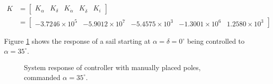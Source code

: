 \documentclass[]{aiaa-tc}%
\begin{document}
\begin{equation}
\begin{aligned}
K &= \begin{bmatrix}
K_{\alpha} & K_{\delta} & K_{\dot{\alpha}} & K_{\dot{\delta}} & K_i
\end{bmatrix}\\ 
 &= \begin{bmatrix}
-3.7246\times10^5 & -5.9012\times10^7 & -5.4575\times10^3 & -1.3001\times10^6 & 1.2580\times10^3
\end{bmatrix}
\end{aligned}
\end{equation}

	Figure  \ref{fig:Controller1} shows the response of a sail starting at $\alpha=\delta=0^{\circ}$ being controlled to $\alpha = 35^{\circ}$.

	\vspace{5 mm}
	
	\begin{figure}[H]
		\centering
		\caption{System response of controller with manually placed poles, commanded $\alpha=35^{\circ}$. }
		\label{fig:Controller1}
	\end{figure}	
\end{document}
